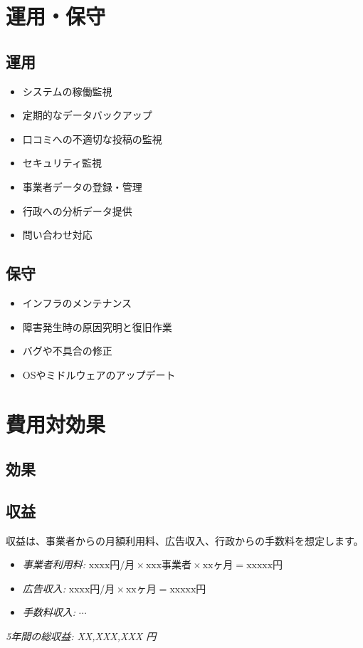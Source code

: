\documentclass{docs}
\begin{document}
\section{運用・保守}
\subsection{運用}
\begin{itemize}
	\item システムの稼働監視
	\item 定期的なデータバックアップ
	\item 口コミへの不適切な投稿の監視
	\item セキュリティ監視
	\item 事業者データの登録・管理
	\item 行政への分析データ提供
	\item 問い合わせ対応
\end{itemize}

\subsection{保守}
\begin{itemize}
	\item インフラのメンテナンス
	\item 障害発生時の原因究明と復旧作業
	\item バグや不具合の修正
	\item OSやミドルウェアのアップデート
\end{itemize}

\section{費用対効果}
\subsection{効果}


\subsection{収益}
収益は、事業者からの月額利用料、広告収入、行政からの手数料を想定します。
\begin{itemize}
	\item \emph{事業者利用料:} $\text{xxxx円/月}\times\text{xxx事業者}
	\times\text{xxヶ月}=\text{xxxxx円}$
	\item \emph{広告収入:} $\text{xxxx円/月}\times\text{xxヶ月}
	=\text{xxxxx円}$
	\item \emph{手数料収入:} $\cdots$
\end{itemize}
\emph{5年間の総収益: XX,XXX,XXX 円}
\end{document}
